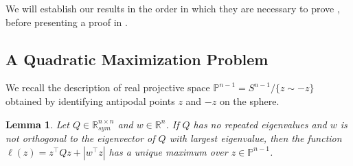\documentclass{article}
\numberwithin{equation}{section}
\newcommand{\R}{\mathbb{R}}
\newcommand{\PP}{\mathbb{P}}
\newtheorem{lemma}{Lemma}[section]
\begin{document}
We will establish our results in the order in which they are necessary to prove , before presenting a proof in .

\subsection{A Quadratic Maximization Problem}

We recall the description of real projective space $\PP^{n-1} = S^{n-1} / \{z\sim -z\}$ obtained by identifying antipodal points $z$ and $-z$ on the sphere.

\begin{lemma}
    \label{lem:inhom_quad}
    Let $Q \in \R^{n \times n}_{sym}$ and $w \in \R^n$. If $Q$ has no repeated eigenvalues and $w$ is not orthogonal to the eigenvector of $Q$ with largest eigenvalue,
    then the function $\ell(z) = z^{\intercal}Qz + |w^{\intercal}z|$ has a unique maximum over $z \in \PP^{n-1}$.

    

\end{lemma}
\end{document}
